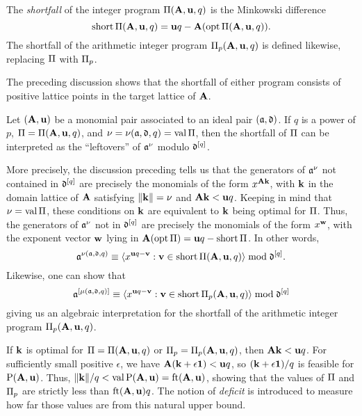 \documentclass{amsart}
\begin{document}
\begin{definition}
   The \emph{shortfall} of the integer program $\Pi(\mathbf{A}, \mathbf{u}, q)$ is the Minkowski difference
   \[ \operatorname{short} \Pi(\mathbf{A}, \mathbf{u}, q) = \mathbf{u}q - \mathbf{A}( \operatorname{opt} \Pi(\mathbf{A}, \mathbf{u}, q)).\]
   The shortfall of the arithmetic integer program $\Pi_p(\mathbf{A}, \mathbf{u}, q)$ is defined likewise, replacing $\Pi$ with $\Pi_p$.
\end{definition}

The preceding discussion shows that the shortfall of either program consists of positive lattice points in the target lattice of $\mathbf{A}$.

\begin{remark}
\label{shortfall motivation: R}
Let $(\mathbf{A},\mathbf{u})$ be a monomial pair associated to an ideal pair $(\mathfrak{a},\mathfrak{d})$.
If $q$ is a power of $p$, $\Pi = \Pi(\mathbf{A},\mathbf{u},q)$, and $\nu = \nu(\mathfrak{a},\mathfrak{d},q) = \operatorname{val} \Pi$, then the shortfall of $\Pi$ can be interpreted as the ``leftovers'' of $\mathfrak{a}^\nu$ modulo $\mathfrak{d}^{[q]}$.

More precisely, the discussion preceding  tells us that the generators of $\mathfrak{a}^{\nu}$ not contained in $\mathfrak{d}^{[q]}$ are precisely the monomials of the form $x^{\mathbf{A} \mathbf{k}}$, with $\mathbf{k}$ in the domain lattice of $\mathbf{A}$ satisfying $\| \mathbf{k} \| = \nu$ and $\mathbf{A}\mathbf{k}<\mathbf{u}q$.
Keeping in mind that $\nu= \operatorname{val} \Pi$, these conditions on $\mathbf{k}$ are equivalent to $\mathbf{k}$ being optimal for $\Pi$.
Thus, the generators of $\mathfrak{a}^{\nu}$ not in $\mathfrak{d}^{[q]}$ are precisely the monomials of the form $x^{\mathbf{w}}$, with the exponent vector $\mathbf{w}$ lying in $\mathbf{A}(\operatorname{opt} \Pi) = \mathbf{u}q - \operatorname{short} \Pi$.
In other words,
\begin{equation}
\label{algebraic shortfall PI general: e}
 \mathfrak{a}^{\nu(\mathfrak{a}, \mathfrak{d}, q)} \equiv \langle x^{\mathbf{u}q-\mathbf{v}}: \mathbf{v} \in \operatorname{short} \Pi(\mathbf{A},\mathbf{u},q) \rangle \bmod \mathfrak{d}^{[q]}.
 \end{equation}
Likewise, one can show that
\begin{equation}
\label{algebraic shortfall PI_p general: e}
\mathfrak{a}^{[\mu(\mathfrak{a}, \mathfrak{d}, q)]} \equiv \langle x^{\mathbf{u}q-\mathbf{v}}: \mathbf{v} \in \operatorname{short} \Pi_p(\mathbf{A},\mathbf{u},q) \rangle \bmod \mathfrak{d}^{[q]}
\end{equation}
giving us an algebraic interpretation for the shortfall of the arithmetic integer program $\Pi_p(\mathbf{A},\mathbf{u},q)$.
\end{remark}

If $\mathbf{k}$ is optimal for $\Pi = \Pi(\mathbf{A},\mathbf{u},q)$ or $\Pi_p = \Pi_p(\mathbf{A},\mathbf{u},q)$, then $\mathbf{A}\mathbf{k} < \mathbf{u}q$.
For sufficiently small positive $\epsilon$, we have $\mathbf{A}(\mathbf{k}+\epsilon\mathbf{1}) < \mathbf{u}q$, so $(\mathbf{k}+\epsilon \mathbf{1})/q$ is feasible for $\mathrm{P}(\mathbf{A},\mathbf{u})$.
Thus, $\| \mathbf{k} \|/q < \operatorname{val} \mathrm{P}(\mathbf{A},\mathbf{u}) = \operatorname{ft}(\mathbf{A}, \mathbf{u})$, showing that the values of $\Pi$ and $\Pi_p$ are strictly less than $\operatorname{ft}(\mathbf{A}, \mathbf{u})q$.
The notion of \emph{deficit} is introduced to measure how far those values are from this natural upper bound.
\end{document}
